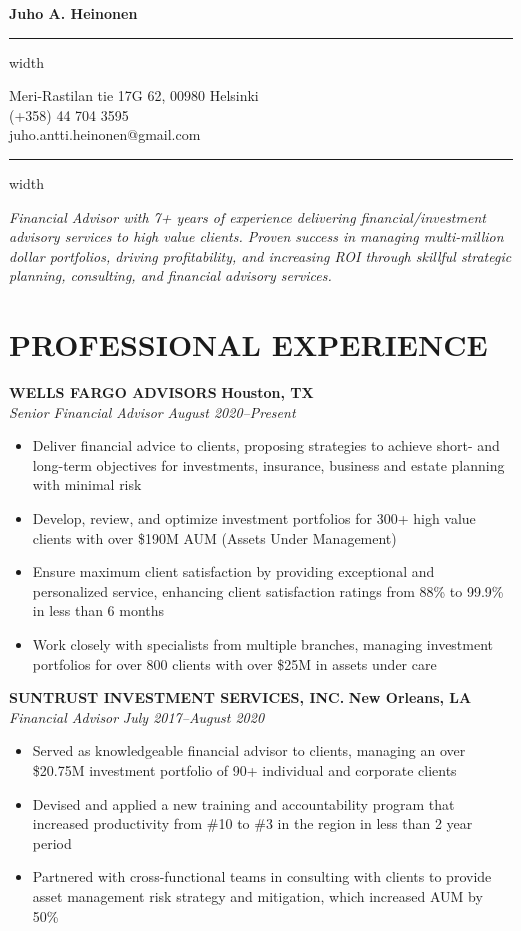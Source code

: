 \documentclass[11pt,letterpaper]{article}
\newcommand{\name}[1]{
  \begin{center}
    \Huge\textbf{#1}
  \end{center}
  \vspace{-0.5em}
  \hrule height 0.4pt width \textwidth
  \vspace{0.5em}
}
\newcommand{\contact}[3]{
  \begin{center}
    #1 \\
    #2 \\
    #3
  \end{center}
  \vspace{-0.5em}
  \hrule height 0.4pt width \textwidth
  \vspace{0.5em}
}
\newcommand{\role}[4]{
  \begin{center}
  \textbf{#1} \hfill \textbf{#2} \\
  \textit{#3} \hfill \textit{#4}
  \end{center}
}
\begin{document}
\name{Juho A. Heinonen}
\vspace{-0.5em}
\contact{Meri-Rastilan tie 17G 62, 00980 Helsinki}{(+358) 44 704 3595}{juho.antti.heinonen@gmail.com}

\vspace{-0.5em}
\begin{center}
\textit{Financial Advisor with 7+ years of experience delivering financial/investment advisory services to high value clients. Proven success in managing multi-million dollar portfolios, driving profitability, and increasing ROI through skillful strategic planning, consulting, and financial advisory services.}
\end{center}

\section{PROFESSIONAL EXPERIENCE}

\vspace{1em}
\role{WELLS FARGO ADVISORS}{Houston, TX}{Senior Financial Advisor}{August 2020--Present}
\begin{itemize}[leftmargin=*,nosep]
  \item Deliver financial advice to clients, proposing strategies to achieve short- and long-term objectives for investments, insurance, business and estate planning with minimal risk
  \item Develop, review, and optimize investment portfolios for 300+ high value clients with over \$190M AUM (Assets Under Management)
  \item Ensure maximum client satisfaction by providing exceptional and personalized service, enhancing client satisfaction ratings from 88\% to 99.9\% in less than 6 months
  \item Work closely with specialists from multiple branches, managing investment portfolios for over 800 clients with over \$25M in assets under care
\end{itemize}

\role{SUNTRUST INVESTMENT SERVICES, INC.}{New Orleans, LA}{Financial Advisor}{July 2017--August 2020}
\begin{itemize}[leftmargin=*,nosep,topsep=0pt]
  \item Served as knowledgeable financial advisor to clients, managing an over \$20.75M investment portfolio of 90+ individual and corporate clients
  \item Devised and applied a new training and accountability program that increased productivity from \#10 to \#3 in the region in less than 2 year period
  \item Partnered with cross-functional teams in consulting with clients to provide asset management risk strategy and mitigation, which increased AUM by 50\%
\end{itemize}
\end{document}
